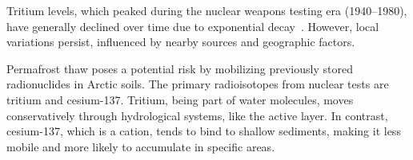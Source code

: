 Tritium levels, which peaked during the nuclear weapons testing era (1940–1980), have generally declined over time due to exponential decay~\citep{bondPermafrostThawImplications2018,rozanskiTritiumGlobalAtmosphere1991,schmidtOverviewTritiumRecords2020}. 
However, local variations persist, influenced by nearby sources and geographic factors.

Permafrost thaw poses a potential risk by mobilizing previously stored radionuclides in Arctic soils. 
The primary radioisotopes from nuclear tests are tritium and cesium-137. 
Tritium, being part of water molecules, moves conservatively through hydrological systems, like the active layer. 
In contrast, cesium-137, which is a cation, tends to bind to shallow sediments, making it less mobile and more likely to accumulate in specific areas.
